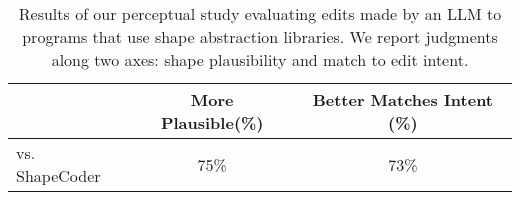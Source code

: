\begin{table}[t]
    \centering
    \small
    \caption{
    Results of our perceptual study evaluating edits made by an LLM to programs that use shape abstraction libraries.  
    We report judgments along two axes: shape plausibility and match to edit intent. 
    }
    \begin{tabular}{@{}lcc@{}}
        \toprule
                & \textbf{More Plausible(\%)} & \textbf{Better Matches Intent (\%)} \\
        \midrule
        vs. ShapeCoder       &       75\%       &    73\%                             \\ 
        \bottomrule
    \end{tabular}
    \label{tab:llm_edit}
\vspace*{-.1in}
\end{table}